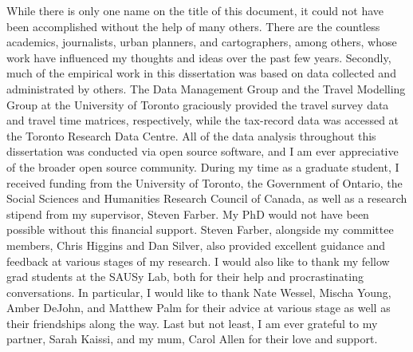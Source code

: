 \documentclass[11 pt, letterpaper]{report}
\begin{document}
While there is only one name on the title of this document, it could not have been accomplished without the help of many others. There are the countless academics, journalists, urban planners, and cartographers, among others, whose work have influenced my thoughts and ideas over the past few years. Secondly, much of the empirical work in this dissertation was based on data collected and administrated by others. The Data Management Group and the Travel Modelling Group at the University of Toronto graciously provided the travel survey data and travel time matrices, respectively, while the tax-record data was accessed at the Toronto Research Data Centre. All of the data analysis throughout this dissertation was conducted via open source software, and I am ever appreciative of the broader open source community. During my time as a graduate student, I received funding from the University of Toronto, the Government of Ontario, the Social Sciences and Humanities Research Council of Canada, as well as a research stipend from my supervisor, Steven Farber. My PhD would not have been possible without this financial support. Steven Farber, alongside my committee members, Chris Higgins and Dan Silver, also provided excellent guidance and feedback at various stages of my research. I would also like to thank my fellow grad students at the SAUSy Lab, both for their help and procrastinating conversations. In particular, I would like to thank Nate Wessel, Mischa Young, Amber DeJohn, and Matthew Palm for their advice at various stage as well as their friendships along the way. Last but not least, I am ever grateful to my partner, Sarah Kaissi, and my mum, Carol Allen for their love and support.




\newpage





\tableofcontents


\newpage







\listoffigures

\newpage



\listoftables



\hypersetup{
	colorlinks=true,
	linkcolor=red,
	citecolor=blue,
	urlcolor=blue
}
\end{document}
